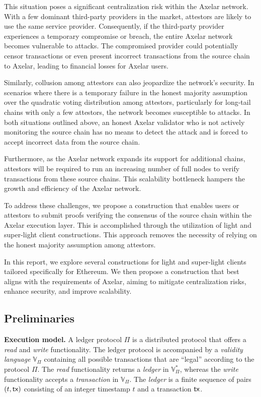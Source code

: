 This situation poses a significant centralization risk within the Axelar network. With a few dominant third-party providers in the market, attestors are likely to use the same service provider. Consequently, if the third-party provider experiences a temporary compromise or breach, the entire Axelar network becomes vulnerable to attacks. The compromised provider could potentially censor transactions or even present incorrect transactions from the source chain to Axelar, leading to financial losses for Axelar users.

Similarly, collusion among attestors can also jeopardize the network's security. In scenarios where there is a temporary failure in the honest majority assumption over the quadratic voting distribution among attestors, particularly for long-tail chains with only a few attestors, the network becomes susceptible to attacks. In both situations outlined above, an honest Axelar validator who is not actively monitoring the source chain has no means to detect the attack and is forced to accept incorrect data from the source chain.

Furthermore, as the Axelar network expands its support for additional chains, attestors will be required to run an increasing number of full nodes to verify transactions from these source chains. This scalability bottleneck hampers the growth and efficiency of the Axelar network.

To address these challenges, we propose a construction that enables users or attestors to submit proofs verifying the consensus of the source chain within the Axelar execution layer. This is accomplished through the utilization of light and super-light client constructions. This approach removes the necessity of relying on the honest majority assumption among attestors.

In this report, we explore several constructions for light and super-light clients tailored specifically for Ethereum. We then propose a construction that best aligns with the requirements of Axelar, aiming to mitigate centralization risks, enhance security, and improve scalability.

\subsection{Preliminaries}
\noindent
\textbf{Execution model.}
A ledger protocol $\Pi$ is a distributed protocol that offers
a \emph{read} and \emph{write} functionality.
The ledger protocol is accompanied by a \emph{validity language}
$\mathbb{V}_{\Pi}$ containing all possible transactions that are ``legal''
according to the protocol $\Pi$.
The
\emph{read} functionality returns a \emph{ledger} in $\mathbb{V}_{\Pi}^*$,
whereas the \emph{write} functionality accepts a \emph{transaction} in $\mathbb{V}_\Pi$.
The \emph{ledger} is a finite sequence of pairs $(t, \textsf{tx})$ consisting
of an integer timestamp $t$ and a transaction $\textsf{tx}$.

